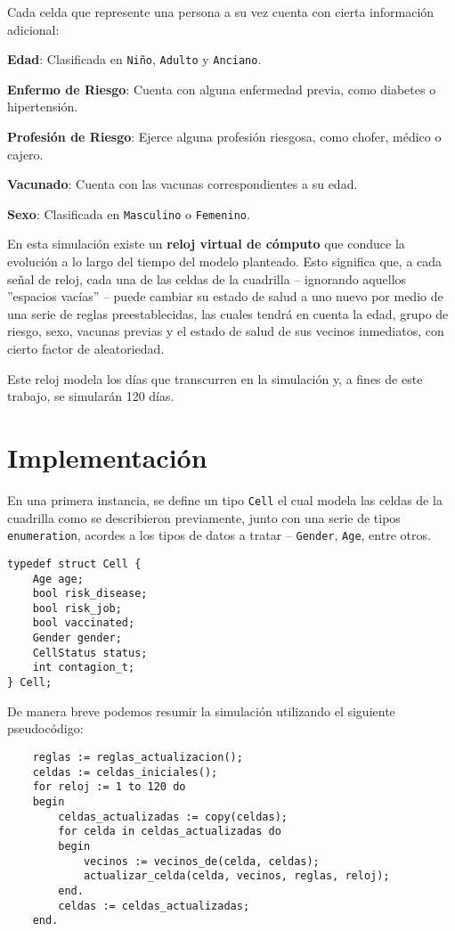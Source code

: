 \documentclass[a4paper,12pt]{article}
\begin{document}
Cada celda que represente una persona a su vez cuenta con cierta información adicional:
\begin{description}[leftmargin=!]
    \item \textbf{Edad}: Clasificada en \verb|Niño|, \verb|Adulto| y \verb|Anciano|.
    \item \textbf{Enfermo de Riesgo}: Cuenta con alguna enfermedad previa, como diabetes o hipertensión.
    \item \textbf{Profesión de Riesgo}: Ejerce alguna profesión riesgosa, como chofer, médico o cajero.
    \item \textbf{Vacunado}: Cuenta con las vacunas correspondientes a su edad.
    \item \textbf{Sexo}: Clasificada en \verb|Masculino| o \verb|Femenino|.
\end{description}

En esta simulación existe un \textbf{reloj virtual de cómputo} que conduce la evolución a lo largo del tiempo del modelo planteado. Esto significa que, a cada señal de reloj, cada una de las celdas de la cuadrilla -- ignorando aquellos ''espacios vacías'' -- puede cambiar su estado de salud a uno nuevo por medio de una serie de reglas preestablecidas, las cuales tendrá en cuenta la edad,
grupo de riesgo, sexo, vacunas previas y el estado de salud de sus vecinos inmediatos, con cierto factor de aleatoriedad.

Este reloj modela los días que transcurren en la simulación y, a fines de este trabajo, se simularán 120 días.

\section{Implementación}

En una primera instancia, se define un tipo \verb|Cell| el cual modela las celdas de la cuadrilla como se describieron previamente, junto con una serie de tipos \verb|enumeration|, acordes a los tipos de datos a tratar -- \verb|Gender|, \verb|Age|, entre otros.
\begin{verbatim}
typedef struct Cell {
    Age age;
    bool risk_disease;
    bool risk_job;
    bool vaccinated;
    Gender gender;
    CellStatus status;
    int contagion_t;
} Cell;
\end{verbatim}

De manera breve podemos resumir la simulación utilizando el siguiente pseudocódigo:
\begin{verbatim}
    reglas := reglas_actualizacion();
    celdas := celdas_iniciales();
    for reloj := 1 to 120 do
    begin
        celdas_actualizadas := copy(celdas);
        for celda in celdas_actualizadas do
        begin
            vecinos := vecinos_de(celda, celdas);
            actualizar_celda(celda, vecinos, reglas, reloj);
        end.
        celdas := celdas_actualizadas;
    end.
\end{verbatim}
\end{document}
